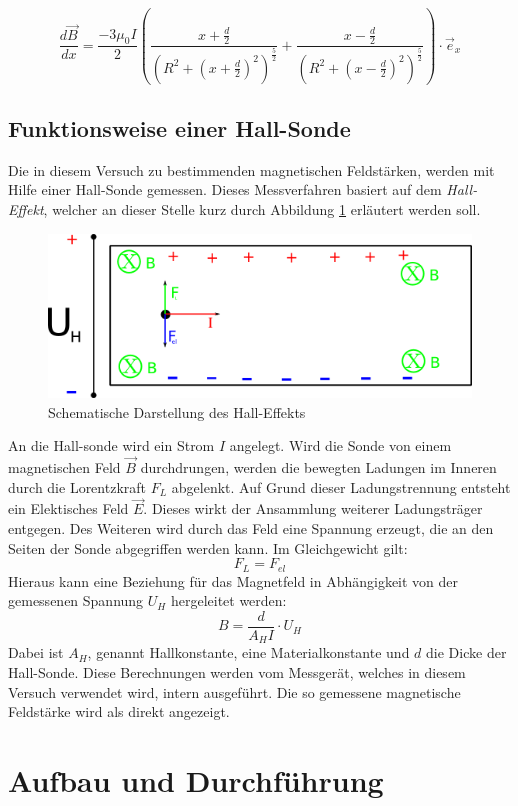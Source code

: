 \documentclass[11pt,ngerman,a4paper]{article}
\begin{document}
\begin{equation}
\frac{d\vec B}{d x} = \frac{-3\mu_0I}{2}\left( \frac{x+\frac d2}{\left(R^2 + (x+\frac d2)^2 \right)^\frac52} + \frac{x-\frac d2}{\left(R^2 + (x-\frac d2)^2 \right)^\frac52}\right) \cdot \vec e_x
\end{equation}
\subsection{Funktionsweise einer Hall-Sonde}
Die in diesem Versuch zu bestimmenden magnetischen Feldstärken, werden mit Hilfe einer Hall-Sonde gemessen. Dieses Messverfahren basiert auf dem \textit{Hall-Effekt}, welcher an dieser Stelle kurz durch Abbildung \ref{hall} erläutert werden soll.  

\begin{figure}[htp]
\centering
\includegraphics[scale=1.00]{hall.png}
\caption{Schematische Darstellung des Hall-Effekts}
\label{hall}
\end{figure}

An die Hall-sonde wird ein Strom $I$ angelegt. Wird die Sonde von einem magnetischen Feld $\vec B$ durchdrungen, werden die bewegten Ladungen im Inneren durch die Lorentzkraft $F_L$ abgelenkt. Auf Grund dieser Ladungstrennung entsteht ein Elektisches Feld $\vec E$. Dieses wirkt der Ansammlung weiterer Ladungsträger entgegen. Des Weiteren wird durch das Feld eine Spannung erzeugt, die an den Seiten der Sonde abgegriffen werden kann. Im Gleichgewicht gilt:
\[
F_L = F_{el}
\]
Hieraus kann eine Beziehung für das Magnetfeld in Abhängigkeit von der gemessenen Spannung $U_H$ hergeleitet werden:
\[
B = \frac{d}{A_H I } \cdot U_H
\]
Dabei ist $A_H$, genannt Hallkonstante, eine Materialkonstante und $d$ die Dicke der Hall-Sonde. 
Diese Berechnungen werden vom Messgerät, welches in diesem Versuch verwendet wird, intern ausgeführt. Die so gemessene magnetische Feldstärke wird als direkt angezeigt.

\section{Aufbau und Durchführung}
\end{document}
